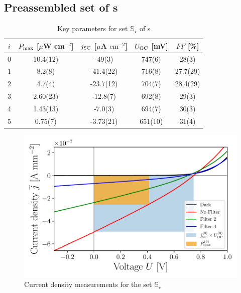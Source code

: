\documentclass[a4paper,10pt,twocolumn]{article}
\begin{document}
\begin{extract*}
\subsection{Preassembled set of \BHSC s}

\begin{table}[h]\centering
	\caption{Key parameters for set $\mathbb{S}_\star$ of \BHSC s}
	\label{tab:keyparamsstar}
	\begin{tabular}{@{}ccccc@{}}\toprule
		$i$ & $P_{\text{max}}$ [$\mu$W cm$^{-2}$] & $j_{\text{SC}}$ [$\mu$A $\mathrm{cm}^{-2}$] & $U_{\text{OC}}$ [mV] & $FF$ [\%]\\\midrule
		0 &   10.4(12)  &  -49(3)  & 747(6) & 28(3) \\
		1 &   8.2(8)  &  -41.4(22)  & 716(8) & 27.7(29) \\
		2 &   4.7(4)  &  -23.7(12)  & 704(7) & 28.4(29) \\
		3 &   2.60(23)  &  -12.8(7)  & 692(8) & 29(3) \\
		4 &   1.43(13)  &  -7.0(3)  & 694(7) & 30(3)\\
		5 &  0.75(7)  &  -3.73(21)  & 651(10) & 31(4) \\\bottomrule
	\end{tabular}
\end{table}

\begin{figure}[h]\centering
	\includegraphics[width=\columnwidth]{../../../IV-Curve-Analysis/OSCPGraph.pdf}
	\caption{Current density measurements for the set $\mathbb{S}_\star$}
	\label{fig:OSCstarGraph}
\end{figure}

\end{extract*}
\end{document}
